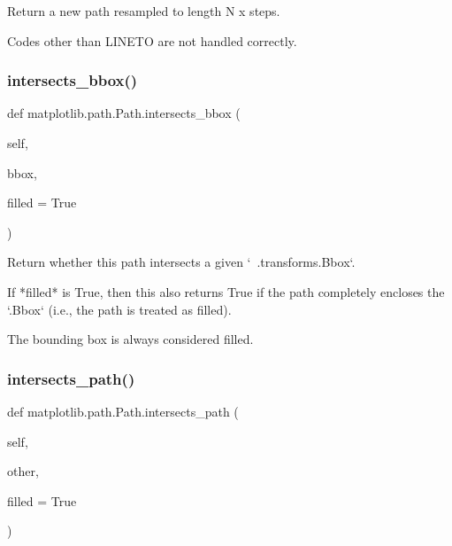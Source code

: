 \begin{DoxyVerb}Return a new path resampled to length N x steps.

Codes other than LINETO are not handled correctly.
\end{DoxyVerb}
 \mbox{\label{classmatplotlib_1_1path_1_1Path_a7fe543c6509ef4d0896638c9284d9274}} 
\subsubsection{\texorpdfstring{intersects\+\_\+bbox()}{intersects\_bbox()}}
{\footnotesize\ttfamily def matplotlib.\+path.\+Path.\+intersects\+\_\+bbox (\begin{DoxyParamCaption}\item[{}]{self,  }\item[{}]{bbox,  }\item[{}]{filled = {\ttfamily True} }\end{DoxyParamCaption})}

\begin{DoxyVerb}Return whether this path intersects a given `~.transforms.Bbox`.

If *filled* is True, then this also returns True if the path completely
encloses the `.Bbox` (i.e., the path is treated as filled).

The bounding box is always considered filled.
\end{DoxyVerb}
 \mbox{\label{classmatplotlib_1_1path_1_1Path_a6281e51d8ac1a760cadc0c8209a7da9d}} 
\subsubsection{\texorpdfstring{intersects\+\_\+path()}{intersects\_path()}}
{\footnotesize\ttfamily def matplotlib.\+path.\+Path.\+intersects\+\_\+path (\begin{DoxyParamCaption}\item[{}]{self,  }\item[{}]{other,  }\item[{}]{filled = {\ttfamily True} }\end{DoxyParamCaption})}

